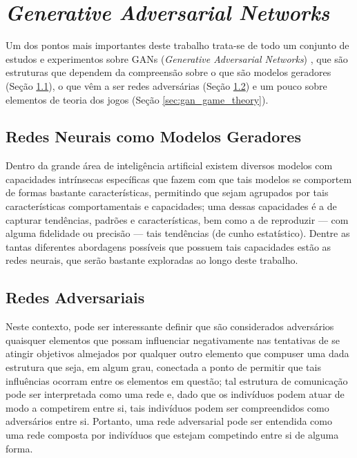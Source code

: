 \chapter{\textit{Generative Adversarial Networks}}
\label{cha:gan}

Um dos pontos mais importantes deste trabalho trata-se de todo um conjunto de estudos e experimentos sobre GANs (\textit{Generative Adversarial Networks}) \citep{NIPS2014_5423}, que são estruturas que dependem da compreensão sobre o que são modelos geradores (Seção \ref{sec:gan_nn_as_generative_model}), o que vêm a ser redes adversárias (Seção \ref{sec:gan_adversarial_nets}) e um pouco sobre elementos de teoria dos jogos (Seção \ref{sec:gan_game_theory}).

\section{Redes Neurais como Modelos Geradores}
\label{sec:gan_nn_as_generative_model}

Dentro da grande área de inteligência artificial existem diversos modelos com capacidades intrínsecas específicas que fazem com que tais modelos se comportem de formas bastante características, permitindo que sejam agrupados por tais características comportamentais e capacidades; uma dessas capacidades é a de capturar tendências, padrões e características, bem como a de reproduzir --- com alguma fidelidade ou precisão --- tais tendências (de cunho estatístico). Dentre as tantas diferentes abordagens possíveis que possuem tais capacidades estão as redes neurais, que serão bastante exploradas ao longo deste trabalho.



\section{Redes Adversariais}
\label{sec:gan_adversarial_nets}

Neste contexto, pode ser interessante definir que são considerados adversários quaisquer elementos que possam influenciar negativamente nas tentativas de se atingir objetivos almejados por qualquer outro elemento que compuser uma dada estrutura que seja, em algum grau, conectada a ponto de permitir que tais influências ocorram entre os elementos em questão; tal estrutura de comunicação pode ser interpretada como uma rede e, dado que os indivíduos podem atuar de modo a competirem entre si, tais indivíduos podem ser compreendidos como adversários entre si. Portanto, uma rede adversarial pode ser entendida como uma rede composta por indivíduos que estejam competindo entre si de alguma forma.



